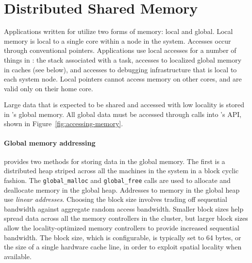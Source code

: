 \section{Distributed Shared Memory}

Applications written for \Grappa utilize two forms of memory: local and
global. Local memory is local to a single core within a node in the system.
Accesses occur through conventional pointers. Applications use local accesses for a
number of things in \Grappa: the stack associated with a task, accesses to
localized global memory in caches (see below), and accesses to debugging
infrastructure that is local to each system node. Local pointers cannot access
memory on other cores, and are valid only on their home core.

Large data that is expected to be shared and accessed with low locality is
stored in \Grappa's global memory. All global data must be accessed through
calls into \Grappa's API, shown in Figure~\ref{fig:accessing-memory}.


\paragraph{Global memory addressing} \Grappa provides two methods for storing
data in the global memory. The first is a distributed heap striped across all
the machines in the system in a block cyclic fashion. The
\texttt{global\_malloc} and \texttt{global\_free} calls are used to allocate
and deallocate memory in the global heap. Addresses to memory in the global
heap use \emph{linear addresses}. Choosing the block size involves trading off
sequential bandwidth against aggregate random access bandwidth. Smaller block
sizes help spread data across all the memory controllers in the cluster, but
larger block sizes allow the locality-optimized memory controllers to provide
increased sequential bandwidth. The block size, which is configurable, is
typically set to 64 bytes, or the size of a single hardware cache line, in
order to exploit spatial locality when available.

